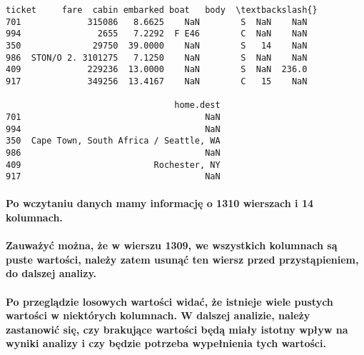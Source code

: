 \documentclass[11pt]{article}
\makeatletter
\newcommand{\boxspacing}{\kern\kvtcb@left@rule\kern\kvtcb@boxsep}
\newcommand{\prompt}[4]{
        {\ttfamily\llap{{\color{#2}[#3]:\hspace{3pt}#4}}\vspace{-\baselineskip}}
    }
\makeatother
\begin{document}
            \begin{tcolorbox}[breakable, size=fbox, boxrule=.5pt, pad at break*=1mm, opacityfill=0]
\prompt{Out}{outcolor}{67}{\boxspacing}
\begin{Verbatim}[commandchars=\\\{\}]
                ticket     fare  cabin embarked boat   body  \textbackslash{}
701             315086   8.6625    NaN        S  NaN    NaN
994               2655   7.2292  F E46        C  NaN    NaN
350              29750  39.0000    NaN        S   14    NaN
986  STON/O 2. 3101275   7.1250    NaN        S  NaN    NaN
409             229236  13.0000    NaN        S  NaN  236.0
917             349256  13.4167    NaN        C   15    NaN

                                 home.dest
701                                    NaN
994                                    NaN
350  Cape Town, South Africa / Seattle, WA
986                                    NaN
409                          Rochester, NY
917                                    NaN
\end{Verbatim}
\end{tcolorbox}
        
    \paragraph{Po wczytaniu danych mamy informację o 1310 wierszach i 14
kolumnach.}\label{po-wczytaniu-danych-mamy-informacjux119-o-1310-wierszach-i-14-kolumnach.}

\paragraph{Zauważyć można, że w wierszu 1309, we wszystkich kolumnach są
puste wartości, należy zatem usunąć ten wiersz przed przystąpieniem, do
dalszej
analizy.}\label{zauwaux17cyux107-moux17cna-ux17ce-w-wierszu-1309-we-wszystkich-kolumnach-sux105-puste-wartoux15bci-naleux17cy-zatem-usunux105ux107-ten-wiersz-przed-przystux105pieniem-do-dalszej-analizy.}

\paragraph{Po przeglądzie losowych wartości widać, że istnieje wiele
pustych wartości w niektórych kolumnach. W dalszej analizie, należy
zastanowić się, czy brakujące wartości będą miały istotny wpływ na
wyniki analizy i czy będzie potrzeba wypełnienia tych
wartości.}\label{po-przeglux105dzie-losowych-wartoux15bci-widaux107-ux17ce-istnieje-wiele-pustych-wartoux15bci-w-niektuxf3rych-kolumnach.-w-dalszej-analizie-naleux17cy-zastanowiux107-siux119-czy-brakujux105ce-wartoux15bci-bux119dux105-miaux142y-istotny-wpux142yw-na-wyniki-analizy-i-czy-bux119dzie-potrzeba-wypeux142nienia-tych-wartoux15bci.}
\end{document}
